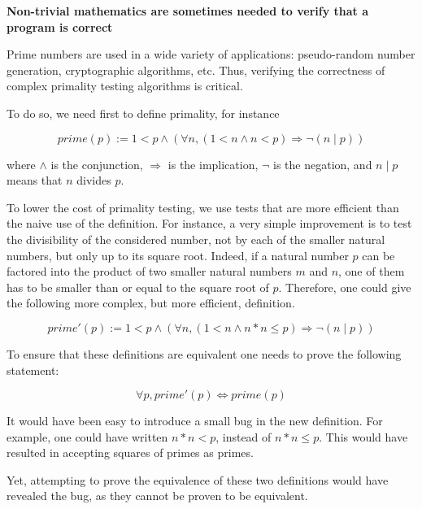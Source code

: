 \begin{shaded}
\vspace*{-0.5cm}
\begin{center} {\bf \Large Non-trivial mathematics are sometimes
needed to verify that a program is correct}
\end{center}

Prime numbers are used in a wide variety of applications:
pseudo-random number generation, cryptographic algorithms, etc.  Thus,
verifying the correctness of complex primality testing algorithms is
critical.

To do so, we need first to define primality, for instance

$$prime(p) := 1<p \wedge (\forall n, (1<n\wedge n<p) \Rightarrow \neg(n\mid p))$$

where $\wedge$ is the conjunction, $\Rightarrow$ is the implication,
$\neg$ is the negation, and $n\mid p$ means that $n$ divides $p$.

To lower the cost of primality testing, we use tests that are more
efficient than the naive use of the definition.  For instance, a very
simple improvement is to test the divisibility of the considered
number, not by each of the smaller natural numbers, but only up to its
square root.  Indeed, if a natural number $p$ can be factored into the
product of two smaller natural numbers $m$ and $n$, one of them has to
be smaller than or equal to the square root of $p$.  Therefore, one
could give the following more complex, but more efficient, definition.

$$prime'(p) := 1<p \wedge (\forall n, (1<n \wedge n*n\leq p) \Rightarrow \neg(n\mid p))$$

To ensure that these definitions are equivalent one needs to prove
the following statement:

$$\forall p, prime'(p) \Leftrightarrow prime(p)$$

It would have been easy to introduce a small bug
in the new definition.  For example, one could have written
$n*n < p$, instead of $n*n \leq p$.
This would have resulted in accepting squares of primes as primes.

Yet, attempting to prove the equivalence of these two definitions would
have revealed the bug, as they cannot be proven to be equivalent.
\end{shaded}


